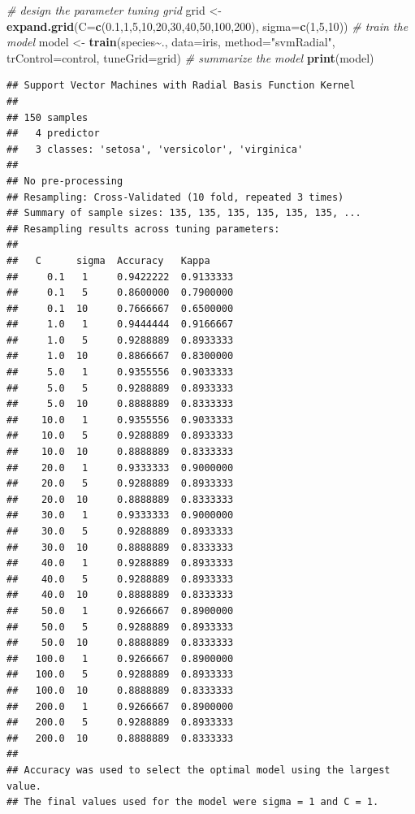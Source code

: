 \documentclass[
]{article}
\newenvironment{Shaded}{\begin{snugshade}}{\end{snugshade}}
\newcommand{\AttributeTok}[1]{\textcolor[rgb]{0.13,0.29,0.53}{#1}}
\newcommand{\CommentTok}[1]{\textcolor[rgb]{0.56,0.35,0.01}{\textit{#1}}}
\newcommand{\DecValTok}[1]{\textcolor[rgb]{0.00,0.00,0.81}{#1}}
\newcommand{\FloatTok}[1]{\textcolor[rgb]{0.00,0.00,0.81}{#1}}
\newcommand{\FunctionTok}[1]{\textcolor[rgb]{0.13,0.29,0.53}{\textbf{#1}}}
\newcommand{\NormalTok}[1]{#1}
\newcommand{\OtherTok}[1]{\textcolor[rgb]{0.56,0.35,0.01}{#1}}
\newcommand{\SpecialCharTok}[1]{\textcolor[rgb]{0.81,0.36,0.00}{\textbf{#1}}}
\newcommand{\StringTok}[1]{\textcolor[rgb]{0.31,0.60,0.02}{#1}}
\begin{document}
\begin{Shaded}
\begin{Highlighting}[]
\CommentTok{\# design the parameter tuning grid}
\NormalTok{grid }\OtherTok{\textless{}{-}} \FunctionTok{expand.grid}\NormalTok{(}\AttributeTok{C=}\FunctionTok{c}\NormalTok{(}\FloatTok{0.1}\NormalTok{,}\DecValTok{1}\NormalTok{,}\DecValTok{5}\NormalTok{,}\DecValTok{10}\NormalTok{,}\DecValTok{20}\NormalTok{,}\DecValTok{30}\NormalTok{,}\DecValTok{40}\NormalTok{,}\DecValTok{50}\NormalTok{,}\DecValTok{100}\NormalTok{,}\DecValTok{200}\NormalTok{), }\AttributeTok{sigma=}\FunctionTok{c}\NormalTok{(}\DecValTok{1}\NormalTok{,}\DecValTok{5}\NormalTok{,}\DecValTok{10}\NormalTok{))}
\CommentTok{\# train the model}
\NormalTok{model }\OtherTok{\textless{}{-}} \FunctionTok{train}\NormalTok{(species}\SpecialCharTok{\textasciitilde{}}\NormalTok{., }\AttributeTok{data=}\NormalTok{iris, }\AttributeTok{method=}\StringTok{"svmRadial"}\NormalTok{, }\AttributeTok{trControl=}\NormalTok{control, }\AttributeTok{tuneGrid=}\NormalTok{grid)}
\CommentTok{\# summarize the model}
\FunctionTok{print}\NormalTok{(model)}
\end{Highlighting}
\end{Shaded}

\begin{verbatim}
## Support Vector Machines with Radial Basis Function Kernel 
## 
## 150 samples
##   4 predictor
##   3 classes: 'setosa', 'versicolor', 'virginica' 
## 
## No pre-processing
## Resampling: Cross-Validated (10 fold, repeated 3 times) 
## Summary of sample sizes: 135, 135, 135, 135, 135, 135, ... 
## Resampling results across tuning parameters:
## 
##   C      sigma  Accuracy   Kappa    
##     0.1   1     0.9422222  0.9133333
##     0.1   5     0.8600000  0.7900000
##     0.1  10     0.7666667  0.6500000
##     1.0   1     0.9444444  0.9166667
##     1.0   5     0.9288889  0.8933333
##     1.0  10     0.8866667  0.8300000
##     5.0   1     0.9355556  0.9033333
##     5.0   5     0.9288889  0.8933333
##     5.0  10     0.8888889  0.8333333
##    10.0   1     0.9355556  0.9033333
##    10.0   5     0.9288889  0.8933333
##    10.0  10     0.8888889  0.8333333
##    20.0   1     0.9333333  0.9000000
##    20.0   5     0.9288889  0.8933333
##    20.0  10     0.8888889  0.8333333
##    30.0   1     0.9333333  0.9000000
##    30.0   5     0.9288889  0.8933333
##    30.0  10     0.8888889  0.8333333
##    40.0   1     0.9288889  0.8933333
##    40.0   5     0.9288889  0.8933333
##    40.0  10     0.8888889  0.8333333
##    50.0   1     0.9266667  0.8900000
##    50.0   5     0.9288889  0.8933333
##    50.0  10     0.8888889  0.8333333
##   100.0   1     0.9266667  0.8900000
##   100.0   5     0.9288889  0.8933333
##   100.0  10     0.8888889  0.8333333
##   200.0   1     0.9266667  0.8900000
##   200.0   5     0.9288889  0.8933333
##   200.0  10     0.8888889  0.8333333
## 
## Accuracy was used to select the optimal model using the largest value.
## The final values used for the model were sigma = 1 and C = 1.
\end{verbatim}
\end{document}

